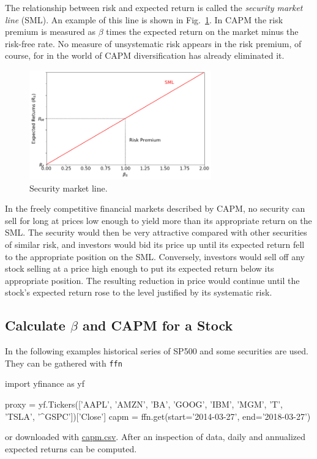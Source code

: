 The relationship between risk and expected return is called the \emph{security market line} (SML). An example of this line is shown in Fig.~\ref{fig:sml}. %
In CAPM the risk premium is measured as $\beta$ times the expected return on the market minus the risk-free rate. No measure of unsystematic risk appears in the risk premium, of course, for in the world of CAPM diversification has already eliminated it.

\begin{figure}[htb]
	\centering
	\includegraphics[width=0.7\textwidth]{figures/sml}
	\caption{Security market line.}
	\label{fig:sml}
\end{figure}

In the freely competitive financial markets described by CAPM, no security can sell for long at prices low enough to yield more than its appropriate return on the SML. The security would then be very attractive compared with other securities of similar risk, and investors would bid its price up until its expected return fell to the appropriate position on the SML. Conversely, investors would sell off any stock selling at a price high enough to put its expected return below its appropriate position. The resulting reduction in price would continue until the stock’s expected return rose to the level justified by its systematic risk.

\subsection{Calculate $\beta$ and CAPM for a Stock}

In the following examples historical series of SP500 and some securities are used. They can be gathered with \texttt{ffn}

\begin{ipython}
import yfinance as yf

proxy = yf.Tickers(['AAPL', 'AMZN', 'BA', 'GOOG', 'IBM', 'MGM', 'T', 'TSLA', '^GSPC'])['Close']
capm = ffn.get(start='2014-03-27', end='2018-03-27')
\end{ipython}
\noindent
or downloaded with \href{https://raw.githubusercontent.com/matteosan1/finance_course/develop/libro/input_files/capm.csv}{capm.csv}.
After an inspection of data, daily and annualized expected returns can be computed.

